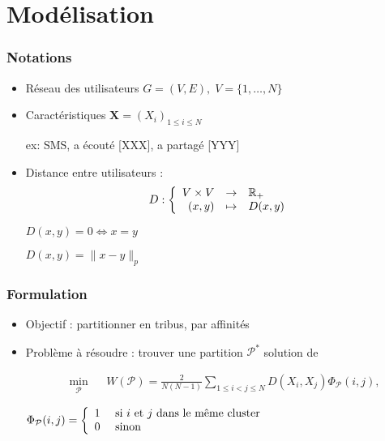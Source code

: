\documentclass[c]{beamer}
\begin{document}
\section{Mod\'elisation}
\begin{frame}
    \frametitle{Notations}
    \begin{itemize}
        \item R\'eseau des utilisateurs $G = (V, E), \; V = \{1, \ldots, N\}$
            \vspace{.3cm}
        \item Caract\'eristiques $\mathbf{X} = \left( X_i \right)_{1 \leq i \leq N}$
            \vspace{0.15cm}

            ex: SMS, a écouté [XXX], a partagé [YYY]
            \vspace{.3cm}
        \item Distance entre utilisateurs :
            \[
                        D:\left\{
                        \begin{array}{r c l}
                            V \times V & \rightarrow & \mathbb{R}_+ \\
                            (x, y) & \mapsto & D(x, y)
                        \end{array}
                        \right.
                    \]

                    $D(x, y) = 0 \iff x = y$
                
                    $D(x, y) = \|x - y\|_p$


    \end{itemize}
\end{frame}

\begin{frame}
    \frametitle{Formulation}
    \begin{itemize}
        \item Objectif : partitionner en tribus, par affinités
        \item
            Problème à r\'esoudre : trouver une partition $\mathcal{P}^*$ solution de

    \[
        \begin{aligned}
            & \min_{\mathcal{P}}
            && W\left(\mathcal{P} \right)
            = \frac{2}{N(N-1)} \sum_{1 \leq i < j \leq N} D(X_i, X_j) \Phi_{\mathcal{P}}(i, j),
        \end{aligned}
    \]


    $\Phi_{\mathcal{P}}(i, j) = \left\{
        \begin{array}{l l}
            1& \text{ si $i$ et $j$ dans le même cluster} \\
            0 & \text{ sinon}
        \end{array}
            \right.
            $

    \end{itemize}

\end{frame}
\end{document}
